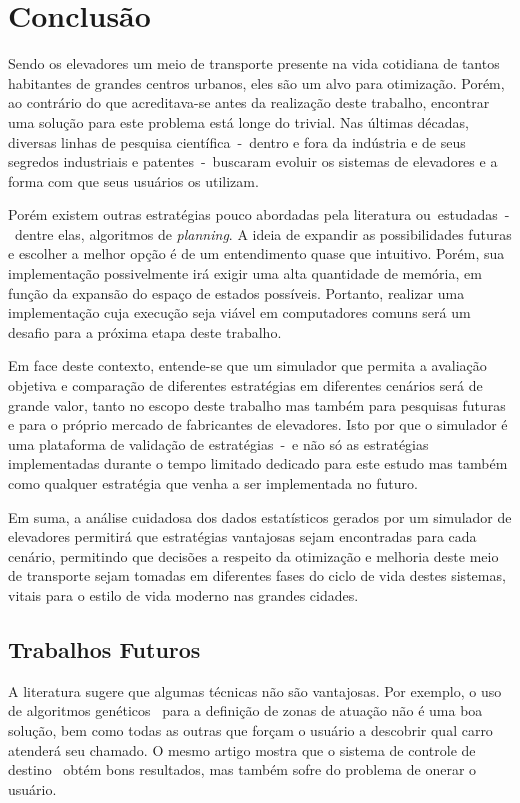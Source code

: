 \chapter{\label{chap:conclusion}Conclusão}

Sendo os elevadores um meio de transporte presente na vida cotidiana de tantos
habitantes de grandes centros urbanos, eles são um alvo para otimização. Porém,
ao contrário do que acreditava-se antes da realização deste trabalho, encontrar
uma solução para este problema está longe do trivial. Nas últimas décadas,
diversas linhas de pesquisa científica~-~dentro e fora da indústria e de seus
segredos industriais e patentes~-~buscaram evoluir os sistemas de elevadores e a
forma com que seus usuários os utilizam.


Porém existem outras estratégias pouco abordadas pela literatura
ou~estudadas~-~dentre elas, algoritmos de \textit{planning}. A ideia de expandir
as possibilidades futuras e escolher a melhor opção é de um entendimento quase
que intuitivo. Porém, sua implementação possivelmente irá exigir uma alta
quantidade de memória, em função da expansão do espaço de estados possíveis.
Portanto, realizar uma implementação cuja execução seja viável em computadores
comuns será um desafio para a próxima etapa deste trabalho.

Em face deste contexto, entende-se que um simulador que permita a avaliação
objetiva e comparação de diferentes estratégias em diferentes cenários será de
grande valor, tanto no escopo deste trabalho mas também para pesquisas futuras e
para o próprio mercado de fabricantes de elevadores. Isto por que o simulador é
uma plataforma de validação de estratégias~-~e não só as estratégias
implementadas durante o tempo limitado dedicado para este estudo mas também como
qualquer estratégia que venha a ser implementada no futuro.

Em suma, a análise cuidadosa dos dados estatísticos gerados por um simulador de
elevadores permitirá que estratégias vantajosas sejam encontradas para cada
cenário, permitindo que decisões a respeito da otimização e melhoria deste meio
de transporte sejam tomadas em diferentes fases do ciclo de vida destes
sistemas, vitais para o estilo de vida moderno nas grandes cidades.

\section{Trabalhos Futuros}

A literatura sugere que algumas técnicas não são vantajosas. Por exemplo, o uso
de algoritmos genéticos~\cite{KOEHLEROTTIGER02} para a definição de zonas de
atuação não é uma boa solução, bem como todas as outras que forçam o usuário a
descobrir qual carro atenderá seu chamado. O mesmo artigo mostra que o sistema
de controle de destino~\cite{KOEHLEROTTIGER02} obtém bons resultados, mas também
sofre do problema de onerar o usuário.

